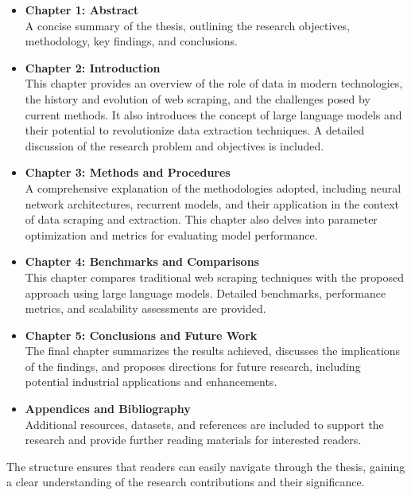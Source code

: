 \begin{itemize}
    \item \textbf{Chapter 1: Abstract} \\
    A concise summary of the thesis, outlining the research objectives, methodology, key findings, and conclusions.

    \item \textbf{Chapter 2: Introduction} \\
    This chapter provides an overview of the role of data in modern technologies, the history and evolution of web scraping, and the challenges posed by current methods. It also introduces the concept of large language models and their potential to revolutionize data extraction techniques. A detailed discussion of the research problem and objectives is included.

    \item \textbf{Chapter 3: Methods and Procedures} \\
    A comprehensive explanation of the methodologies adopted, including neural network architectures, recurrent models, and their application in the context of data scraping and extraction. This chapter also delves into parameter optimization and metrics for evaluating model performance.

    \item \textbf{Chapter 4: Benchmarks and Comparisons} \\
    This chapter compares traditional web scraping techniques with the proposed approach using large language models. Detailed benchmarks, performance metrics, and scalability assessments are provided.

    \item \textbf{Chapter 5: Conclusions and Future Work} \\
    The final chapter summarizes the results achieved, discusses the implications of the findings, and proposes directions for future research, including potential industrial applications and enhancements.

    \item \textbf{Appendices and Bibliography} \\
    Additional resources, datasets, and references are included to support the research and provide further reading materials for interested readers.
\end{itemize}

The structure ensures that readers can easily navigate through the thesis, gaining a clear understanding of the research contributions and their significance.


